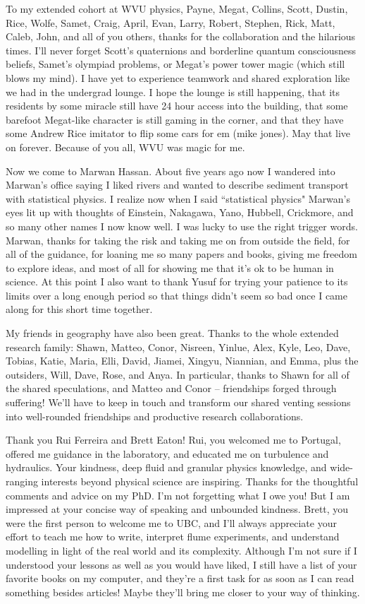 To my extended cohort at WVU physics, Payne, Megat, Collins, Scott, Dustin, Rice, Wolfe, Samet, Craig, April, Evan, Larry, Robert, Stephen, Rick, Matt, Caleb, John, and all of you others, thanks for the collaboration and the hilarious times. I'll never forget Scott's quaternions and borderline quantum consciousness beliefs, Samet's olympiad problems, or Megat's power tower magic (which still blows my mind). I have yet to experience teamwork and shared exploration like we had in the undergrad lounge. I hope the lounge is still happening, that its residents by some miracle still have 24 hour access into the building, that some barefoot Megat-like character is still gaming in the corner, and that they have some Andrew Rice imitator to flip some cars for em (mike jones). May that live on forever. Because of you all, WVU was magic for me.

Now we come to Marwan Hassan. About five years ago now I wandered into Marwan's office saying I liked rivers and wanted to describe sediment transport with statistical physics. I realize now when I said ``statistical physics" Marwan's eyes lit up with thoughts of Einstein, Nakagawa, Yano, Hubbell, Crickmore, and so many other names I now know well. I was lucky to use the right trigger words.
Marwan, thanks for taking the risk and taking me on from outside the field, for all of the guidance, for loaning me so many papers and books, giving me freedom to explore ideas, and most of all for showing me that it's ok to be human in science. At this point I also want to thank Yusuf for trying your patience to its limits over a long enough period so that things didn't seem so bad once I came along for this short time together.

My friends in geography have also been great. Thanks to the whole extended research family: Shawn, Matteo, Conor, Nisreen, Yinlue, Alex, Kyle, Leo, Dave, Tobias, Katie, Maria, Elli, David, Jiamei, Xingyu, Niannian, and Emma, plus the outsiders, Will, Dave, Rose, and Anya. In particular, thanks to Shawn for all of the shared speculations, and Matteo and Conor -- friendships forged through suffering! We'll have to keep in touch and transform our shared venting sessions into well-rounded friendships and productive research collaborations.

Thank you Rui Ferreira and Brett Eaton!
Rui, you welcomed me to Portugal, offered me guidance in the laboratory, and educated me on turbulence and hydraulics. Your kindness, deep fluid and granular physics knowledge, and wide-ranging interests beyond physical science are inspiring. Thanks for the thoughtful comments and advice on my PhD. I'm not forgetting what I owe you! But I am impressed at your concise way of speaking and unbounded kindness.
Brett, you were the first person to welcome me to UBC, and I'll always appreciate your effort to teach me how to write, interpret flume experiments, and understand modelling in light of the real world and its complexity. Although I'm not sure if I understood your lessons as well as you would have liked, I still have a list of your favorite books on my computer, and they're a first task for as soon as I can read something besides articles! Maybe they'll bring me closer to your way of thinking.

